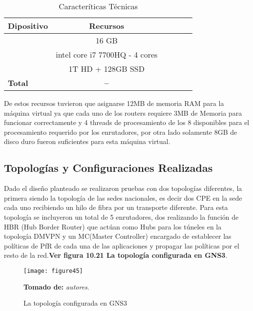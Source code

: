 \begin{table}[ht]
	\caption{Caracteríticas Técnicas}
	\label{tab:hla:results}
\centering
\begin{tabular}{lccccc}
	\toprule
	\multicolumn{1}{c}{\textbf{Dipositivo}} 	& \textbf{Recursos}\\
	\midrule
\cite{Memoria RAM} 		& 16 GB \\
\cite{CPU} 		& intel core i7 7700HQ - 4 cores \\
\cite{Disco Duro} 		& 1T HD + 128GB SSD \\
	\midrule
	\textbf{Total}			& \textbf{--} \\
	\bottomrule
\end{tabular}
\end{table}

De estos recursos tuvieron que asignarse 12MB de memoria RAM para la máquina virtual ya que cada uno de los routers requiere 3MB de Memoria para funcionar correctamente y 4 threads de procesamiento de los 8 disponibles para el procesamiento requerido por los enrutadores, por otra lado solamente 8GB de disco duro fueron suficientes para esta máquina virtual.

\subsection{Topologías y Configuraciones Realizadas} %
\label{sec:Topologías y Configuraciones Realizadas}

Dado el diseño planteado se realizaron pruebas con dos topologías diferentes, la primera siendo la topología de las sedes nacionales, es decir dos CPE en la sede cada uno recibiendo un hilo de fibra por un transporte diferente. Para esta topología se incluyeron un total de 5 enrutadores, dos realizando la función de HBR (Hub Border Router) que actúan como Hubs para los túneles en la topología DMVPN y un MC(Master Controller) encargado de establecer las políticas de PfR de cada una de las aplicaciones y propagar las políticas por el resto de la red.\textbf{Ver figura 10.21 La topología configurada en GNS3}.
\begin{figure}[htbp]
  \centering
    {\texttt{[image: figure45]}}%
  \caption{\footnotesize{La topología configurada en GNS3}}
  \footnotesize{\textbf{Tomado de:} \textit{autores}.}
  \label{fig:fig2subfig}
\end{figure}

